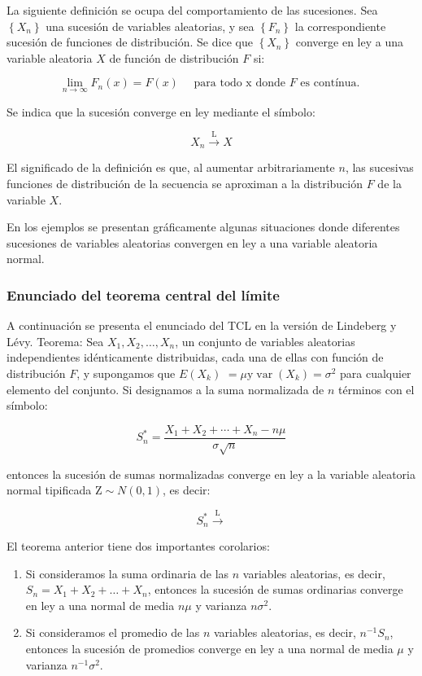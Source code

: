 \documentclass[
]{article}
\begin{document}
La siguiente definición se ocupa del comportamiento de las sucesiones.
Sea \(\left\{X_{n}\right\}\) una sucesión de variables aleatorias, y sea \(\left\{F_{n}\right\}\) la correspondiente sucesión de funciones de distribución. Se dice que \(\left\{X_{n}\right\}\) converge en ley a una variable aleatoria \(X\) de función de distribución \(F\) si:

\[
\lim _{n \rightarrow \infty} F_{n}(x)=F(x) \quad \text { para todo } \mathrm{x} \text { donde } F \text { es contínua. }
\]

Se indica que la sucesión converge en ley mediante el símbolo:

\[
X_{n} \stackrel{\mathrm{L}}{\rightarrow} X
\]

El significado de la definición es que, al aumentar arbitrariamente \(n\), las sucesivas funciones de distribución de la secuencia se aproximan a la distribución \(F\) de la variable \(X\).

En los ejemplos se presentan gráficamente algunas situaciones donde diferentes sucesiones de variables aleatorias convergen en ley a una variable aleatoria normal.

\subsubsection{Enunciado del teorema central del límite}\label{enunciado-del-teorema-central-del-luxedmite}

A continuación se presenta el enunciado del TCL en la versión de Lindeberg y Lévy.
Teorema:
Sea \(X_{1}, X_{2}, \ldots, X_{n}\), un conjunto de variables aleatorias independientes idénticamente distribuidas, cada una de ellas con función de distribución \(F\), y supongamos que \(E\left(X_{k}\right)\) \(=\mu \mathrm{y} \operatorname{var}\left(X_{k}\right)=\sigma^{2}\) para cualquier elemento del conjunto. Si designamos a la suma normalizada de \(n\) términos con el símbolo:

\[
S_{n}^{*}=\frac{X_{1}+X_{2}+\cdots+X_{n}-n \mu}{\sigma \sqrt{n}}
\]

entonces la sucesión de sumas normalizadas converge en ley a la variable aleatoria normal tipificada \(\mathrm{Z} \sim N(0,1)\), es decir:

\[
S_{n}^{*} \xrightarrow{\mathrm{L}}
\]

El teorema anterior tiene dos importantes corolarios:

\begin{enumerate}
\def\labelenumi{\arabic{enumi}.}
\item
  Si consideramos la suma ordinaria de las \(n\) variables aleatorias, es decir, \(S_{n}=X_{1}+X_{2}+\ldots+X_{n}\), entonces la sucesión de sumas ordinarias converge en ley a una normal de media \(n \mu\) y varianza \(n \sigma^{2}\).
\item
  Si consideramos el promedio de las \(n\) variables aleatorias, es decir, \(n^{-1} S_{n}\), entonces la sucesión de promedios converge en ley a una normal de media \(\mu\) y varianza \(n^{-1} \sigma^{2}\).
\end{enumerate}
\end{document}
